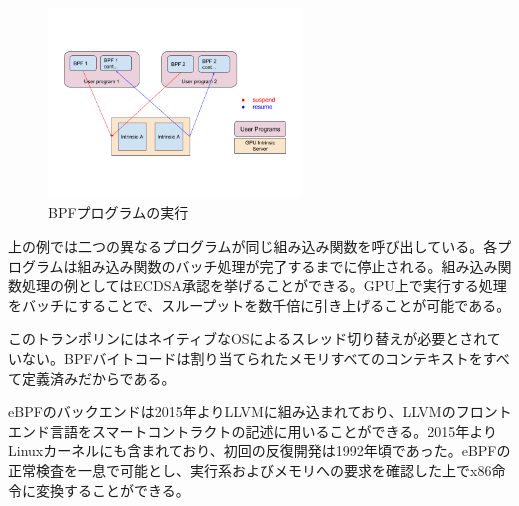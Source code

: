 \documentclass[12pt]{ltjsarticle}
\begin{document}
\begin{figure}
  \begin{center}
    \centering
    \includegraphics[width=0.6\textwidth]{../../figures/fig_11.png}
    \caption[図11]{BPFプログラムの実行\label{fig_11}}
  \end{center}
  \end{figure}

上の例では二つの異なるプログラムが同じ組み込み関数を呼び出している。各プログラムは組み込み関数のバッチ処理が完了するまでに停止される。組み込み関数処理の例としてはECDSA承認を挙げることができる。GPU上で実行する処理をバッチにすることで、スループットを数千倍に引き上げることが可能である。

このトランポリンにはネイティブなOSによるスレッド切り替えが必要とされていない。BPFバイトコードは割り当てられたメモリすべてのコンテキストをすべて定義済みだからである。

eBPFのバックエンドは2015年よりLLVMに組み込まれており、LLVMのフロントエンド言語をスマートコントラクトの記述に用いることができる。2015年よりLinuxカーネルにも含まれており、初回の反復開発は1992年頃であった。eBPFの正常検査を一息で可能とし、実行系およびメモリへの要求を確認した上でx86命令に変換することができる。



\end{document}
